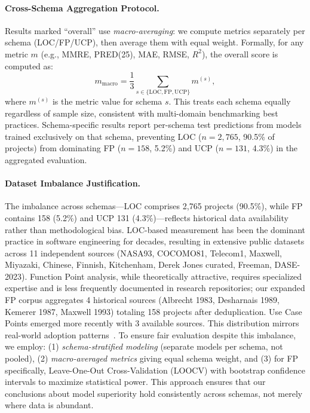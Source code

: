 \documentclass[11pt,a4paper]{article}
\begin{document}
\paragraph{Cross-Schema Aggregation Protocol.}
Results marked ``overall'' use \textit{macro-averaging}: we compute metrics separately per schema (LOC/FP/UCP), then average them with equal weight. Formally, for any metric $m$ (e.g., MMRE, PRED(25), MAE, RMSE, $R^2$), the overall score is computed as:
\[
m_{\text{macro}} = \frac{1}{3} \sum_{s \in \{\text{LOC}, \text{FP}, \text{UCP}\}} m^{(s)},
\]
where $m^{(s)}$ is the metric value for schema $s$. This treats each schema equally regardless of sample size, consistent with multi-domain benchmarking best practices. Schema-specific results report per-schema test predictions from models trained exclusively on that schema, preventing LOC ($n{=}2{,}765$, 90.5\% of projects) from dominating FP ($n{=}158$, 5.2\%) and UCP ($n{=}131$, 4.3\%) in the aggregated evaluation.

\paragraph{Dataset Imbalance Justification.}
The imbalance across schemas—LOC comprises 2,765 projects (90.5\%), while FP contains 158 (5.2\%) and UCP 131 (4.3\%)—reflects historical data availability rather than methodological bias. LOC-based measurement has been the dominant practice in software engineering for decades, resulting in extensive public datasets across 11 independent sources (NASA93, COCOMO81, Telecom1, Maxwell, Miyazaki, Chinese, Finnish, Kitchenham, Derek Jones curated, Freeman, DASE-2023). Function Point analysis, while theoretically attractive, requires specialized expertise and is less frequently documented in research repositories; our expanded FP corpus aggregates 4 historical sources (Albrecht 1983, Desharnais 1989, Kemerer 1987, Maxwell 1993) totaling 158 projects after deduplication. Use Case Points emerged more recently with 3 available sources. This distribution mirrors real-world adoption patterns~\cite{boehm2000cocomo,albrecht1983software}. To ensure fair evaluation despite this imbalance, we employ: (1) \textit{schema-stratified modeling} (separate models per schema, not pooled), (2) \textit{macro-averaged metrics} giving equal schema weight, and (3) for FP specifically, Leave-One-Out Cross-Validation (LOOCV) with bootstrap confidence intervals to maximize statistical power. This approach ensures that our conclusions about model superiority hold consistently across schemas, not merely where data is abundant.
\end{document}
